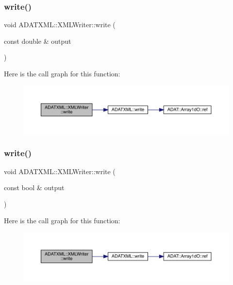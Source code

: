 \subsubsection{\texorpdfstring{write()}{write()}\hspace{0.1cm}{\footnotesize\ttfamily [18/20]}}
{\footnotesize\ttfamily void A\+D\+A\+T\+X\+M\+L\+::\+X\+M\+L\+Writer\+::write (\begin{DoxyParamCaption}\item[{const double \&}]{output }\end{DoxyParamCaption})}

Here is the call graph for this function\+:\nopagebreak
\begin{figure}[H]
\begin{center}
\leavevmode
\includegraphics[width=350pt]{da/da7/classADATXML_1_1XMLWriter_a54aeec25255feb2aa7063885ca48aa7e_cgraph}
\end{center}
\end{figure}
\mbox{\label{classADATXML_1_1XMLWriter_af2cc624cb1450f5b6f430573b626e73e}} 
\subsubsection{\texorpdfstring{write()}{write()}\hspace{0.1cm}{\footnotesize\ttfamily [19/20]}}
{\footnotesize\ttfamily void A\+D\+A\+T\+X\+M\+L\+::\+X\+M\+L\+Writer\+::write (\begin{DoxyParamCaption}\item[{const bool \&}]{output }\end{DoxyParamCaption})}

Here is the call graph for this function\+:\nopagebreak
\begin{figure}[H]
\begin{center}
\leavevmode
\includegraphics[width=350pt]{da/da7/classADATXML_1_1XMLWriter_af2cc624cb1450f5b6f430573b626e73e_cgraph}
\end{center}
\end{figure}
\mbox{\label{classADATXML_1_1XMLWriter_af2cc624cb1450f5b6f430573b626e73e}} 
